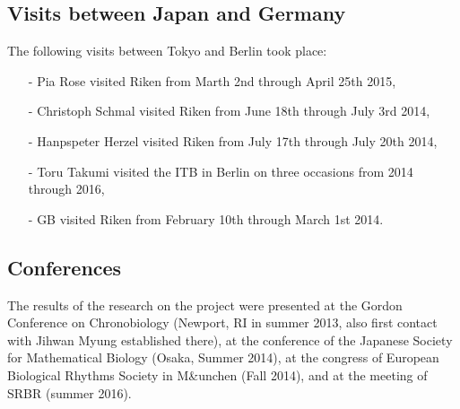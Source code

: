 \documentclass[a4paper]{article}
\begin{document}
\subsection{Visits between Japan and Germany}
The following visits between Tokyo and Berlin took place:
\begin{itemize}
  \item[-] Pia Rose visited Riken from Marth 2nd through April 25th 2015,
  \item[-] Christoph Schmal visited Riken from June 18th through July 3rd
  2014,
  \item[-] Hanpspeter Herzel visited Riken from July 17th through July
  20th 2014,
  \item[-] Toru Takumi visited the ITB in Berlin on three occasions from
  2014 through 2016,
  \item[-] GB visited Riken from February 10th through March 1st 2014.
\end{itemize}

\subsection{Conferences}
The results of the research on the project were presented at the
Gordon Conference on Chronobiology (Newport, RI in summer 2013, also
first contact with Jihwan Myung established there), at the conference
of the Japanese Society for Mathematical Biology (Osaka, Summer 2014),
at the congress of European Biological Rhythms Society in M\&unchen
(Fall 2014), and at the meeting of SRBR (summer 2016).



\end{document}
